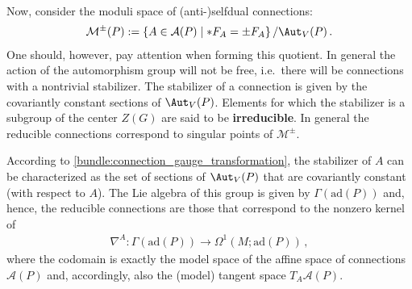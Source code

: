     Now, consider the moduli space of (anti-)selfdual connections:
    \begin{gather}
        \mathcal{M}^\pm(P) := \{A\in\mathcal{A}(P)\mid\ast F_A=\pm F_A\}\, / \Aut_V(P)\,.
    \end{gather}
    One should, however, pay attention when forming this quotient. In general the action of the automorphism group will not be free, i.e.~there will be connections with a nontrivial stabilizer. The stabilizer of a connection is given by the covariantly constant sections of $\Aut_V(P)$. Elements for which the stabilizer is a subgroup of the center $Z(G)$ are said to be \textbf{irreducible}. In general the reducible connections correspond to singular points of $\mathcal{M}^\pm$.

    According to \cref{bundle:connection_gauge_transformation}, the stabilizer of $A$ can be characterized as the set of sections of $\Aut_V(P)$ that are covariantly constant (with respect to $A$). The Lie algebra of this group is given by $\Gamma(\mathrm{ad}(P))$ and, hence, the reducible connections are those that correspond to the nonzero kernel of
    \begin{gather}
        \nabla^A:\Gamma(\mathrm{ad}(P))\rightarrow\Omega^1(M;\mathrm{ad}(P))\,,
    \end{gather}
    where the codomain is exactly the model space of the affine space of connections $\mathcal{A}(P)$ and, accordingly, also the (model) tangent space $T_A\mathcal{A}(P)$.

